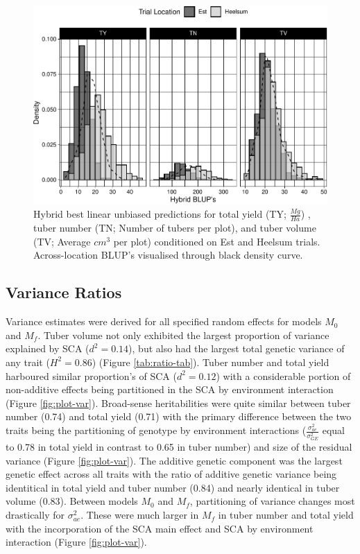     \begin{figure}
    \centering
    \includegraphics[width=\linewidth]{./figs_02/Fig3.pdf}
    \caption{\label{fig:blups-plot}Hybrid best linear unbiased predictions for total yield (TY; \(\frac{Mg}{Ha}\)) , tuber number (TN; Number of tubers per plot), and tuber volume (TV; Average \(cm^3\) per plot) conditioned on Est and Heelsum trials. Across-location BLUP's visualised through black density curve.}
    \end{figure}

\subsection{Variance Ratios}\label{variance-ratios}

        Variance estimates were derived for all specified random effects for models \(M_0\) and \(M_f\). Tuber volume not only exhibited the largest proportion of variance explained by SCA (\(d^2 = 0.14\)), but also had the largest total genetic variance of any trait (\(H^2 = 0.86\)) (Figure \ref{tab:ratio-tab}). Tuber number and total yield harboured similar proportion's of SCA (\(d^2 = 0.12\)) with a considerable portion of non-additive effects being partitioned in the SCA by environment interaction (Figure \ref{fig:plot-var}). Broad-sense heritabilities were quite similar between tuber number (0.74) and total yield (0.71) with the primary difference between the two traits being the partitioning of genotype by environment interactions (\(\frac{\sigma^2_{ae}}{\sigma^2_{GE}}\) equal to 0.78 in total yield in contrast to 0.65 in tuber number) and size of the residual variance (Figure \ref{fig:plot-var}). The additive genetic component was the largest genetic effect across all traits with the ratio of additive genetic variance being identitical in total yield and tuber number (0.84) and nearly identical in tuber volume (0.83). Between models \(M_0\) and \(M_f\), partitioning of variance changes most drastically for \(\sigma^2_{ae}\). These were much larger in \(M_f\) in tuber number and total yield with the incorporation of the SCA main effect and SCA by environment interaction (Figure \ref{fig:plot-var}).

